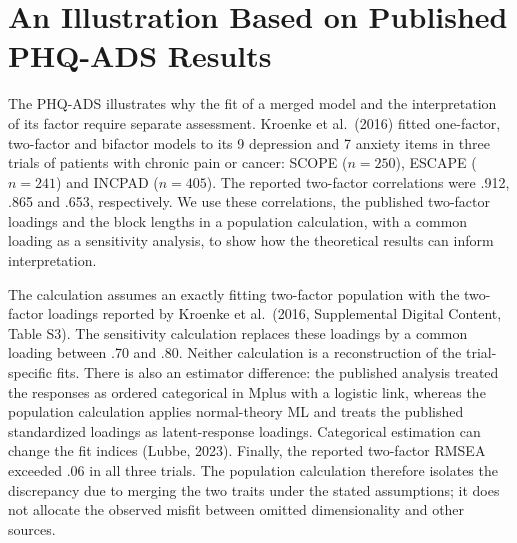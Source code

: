 \section{An Illustration Based on Published PHQ-ADS Results}
\label{sec:phq}

The PHQ-ADS illustrates why the fit of a merged model and the interpretation of its factor require separate assessment. Kroenke et al.\ (2016) fitted one-factor, two-factor and bifactor models to its 9 depression and 7 anxiety items in three trials of patients with chronic pain or cancer: SCOPE ($n=250$), ESCAPE ($n=241$) and INCPAD ($n=405$). The reported two-factor correlations were .912, .865 and .653, respectively. We use these correlations, the published two-factor loadings and the block lengths in a population calculation, with a common loading as a sensitivity analysis, to show how the theoretical results can inform interpretation.

The calculation assumes an exactly fitting two-factor population with the two-factor loadings reported by Kroenke et al.\ (2016, Supplemental Digital Content, Table S3). The sensitivity calculation replaces these loadings by a common loading between .70 and .80. Neither calculation is a reconstruction of the trial-specific fits. There is also an estimator difference: the published analysis treated the responses as ordered categorical in Mplus with a logistic link, whereas the population calculation applies normal-theory ML and treats the published standardized loadings as latent-response loadings. Categorical estimation can change the fit indices (Lubbe, 2023). Finally, the reported two-factor RMSEA exceeded .06 in all three trials. The population calculation therefore isolates the discrepancy due to merging the two traits under the stated assumptions; it does not allocate the observed misfit between omitted dimensionality and other sources.

